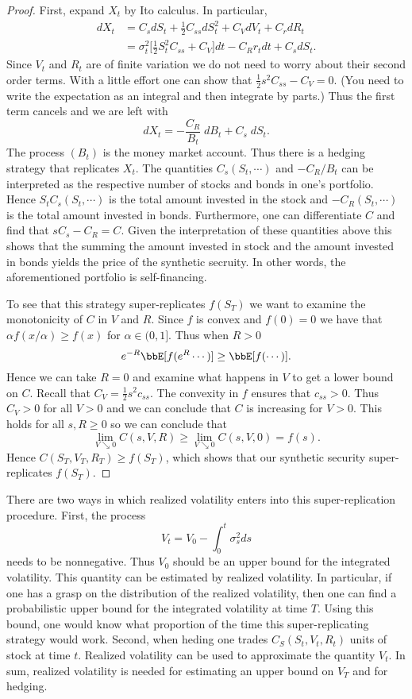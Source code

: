 \documentclass{report}
\begin{document}
\begin{proof}
First, expand $X_t$ by Ito calculus.  In particular,
\begin{align*}
dX_t & = C_s dS_t + \frac{1}{2} C_{ss} dS_t^2 + C_V dV_t + C_r dR_t \\
& = \sigma_t^2 \Big[ \frac{1}{2} S_t^2 C_{ss} + C_V \Big] dt - C_R r_t
dt + C_s dS_t.
\end{align*}
Since $V_t$ and $R_t$ are of finite variation we do not need to worry
about their second order terms.  With a little effort one can show
that $\frac{1}{2} s^2 C_{ss} - C_V = 0$.  (You need to write the
expectation as an integral and then integrate by parts.)  Thus the
first term cancels and we are left with
\[
dX_t = - \frac{C_R}{B_t} \; dB_t + C_s \; dS_t.
\]
The process $(B_t)$ is the money market account.  Thus there is a
hedging strategy that replicates $X_t$.  The quantities $C_s(S_t,
\cdots)$ and $-C_R / B_t$ can be interpreted as the respective number
of stocks and bonds in one's portfolio.  Hence $S_t C_s(S_t, \cdots)$
is the total amount invested in the stock and $-C_R(S_t, \cdots)$ is
the total amount invested in bonds.  Furthermore, one can
differentiate $C$ and find that $s C_s - C_R = C$.  Given the
interpretation of these quantities above this shows that the summing
the amount invested in stock and the amount invested in bonds yields
the price of the synthetic secruity.  In other words, the
aforementioned portfolio is self-financing.

To see that this strategy super-replicates $f(S_T)$ we want to examine
the monotonicity of $C$ in $V$ and $R$.  Since $f$ is convex and $f(0)
= 0$ we have that $\alpha f(x/ \alpha) \geq f(x)$ for $\alpha \in
(0,1]$.  Thus when $R > 0$ 
\[
e^{-R} \bbE[ f(e^{R} \cdots) ] \geq \bbE[ f(\cdots) ].
\]
Hence we can take $R = 0$ and examine what happens in $V$ to get a
lower bound on $C$.  Recall that $C_V = \frac{1}{2} s^2 c_{ss}$.  The
convexity in $f$ ensures that $c_{ss} > 0$.  Thus $C_V > 0$ for all $V
> 0$ and we can conclude that $C$ is increasing for $V>0$.  This holds
for all $s, R \geq 0$ so we can conclude that
\[
\lim_{V \searrow 0} C(s, V, R) \geq \lim_{V \searrow 0} C(s,V,0) =
f(s).
\]
Hence $C(S_T, V_T, R_T) \geq f(S_T)$, which shows that our synthetic
security super-replicates $f(S_T)$.
\end{proof}

There are two ways in which realized volatility enters into this
super-replication procedure.  First, the process
\[
V_t = V_0 - \int_0^t \sigma_s^2 ds
\]
needs to be nonnegative.  Thus $V_0$ should be an upper bound for the
integrated volatility.  This quantity can be estimated by realized
volatility.  In particular, if one has a grasp on the distribution of
the realized volatility, then one can find a probabilistic upper bound
for the integrated volatility at time $T$.  Using this bound, one
would know what proportion of the time this super-replicating strategy
would work.  Second, when heding one trades $C_S(S_t, V_t, R_t)$ units
of stock at time $t$.  Realized volatility can be used to approximate
the quantity $V_t$.  In sum, realized volatility is needed for 
estimating an upper bound on $V_T$ and for hedging.
\end{document}

